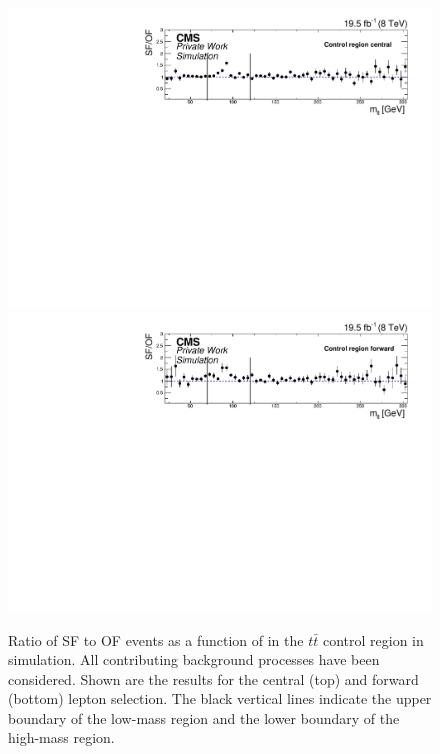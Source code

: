 \begin{figure}
\begin{center}
\includegraphics[scale=0.5]{plots/BG/control/rSFOF_ControlCentral_Full2012_Mll_None_MC.pdf}\\
\includegraphics[scale=0.5]{plots/BG/control/rSFOF_ControlForward_Full2012_Mll_None_MC.pdf}
\caption{Ratio of SF to OF events as a function of \mll in the $t\bar{t}$ control region in simulation. All contributing background processes have been considered. Shown are the results for the central (top) and forward (bottom) lepton selection. The black vertical lines indicate the upper boundary of the low-mass region and the lower boundary of the high-mass region.}
\label{fig:controlRatioMC}
\end{center}
\end{figure}

